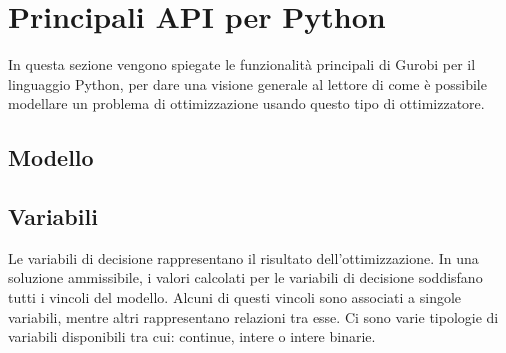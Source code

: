 \section{Principali API per Python}
In questa sezione vengono spiegate le funzionalità principali di Gurobi per il linguaggio Python, per dare una visione generale al lettore di come è possibile modellare un problema di ottimizzazione usando questo tipo di ottimizzatore.



\subsection{Modello}



\subsection{Variabili}
Le variabili di decisione rappresentano il risultato dell'ottimizzazione.
In una soluzione ammissibile, i valori calcolati per le variabili di decisione soddisfano tutti i vincoli del modello. Alcuni di questi vincoli sono associati a singole variabili, mentre altri rappresentano relazioni tra esse.
Ci sono varie tipologie di variabili disponibili tra cui: continue, intere o intere binarie.

